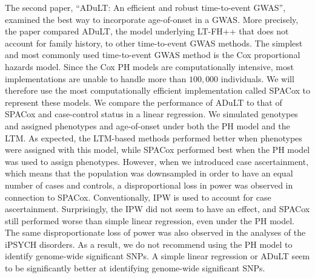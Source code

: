 The second paper, \enquote{ADuLT: An efficient and robust time-to-event GWAS}, examined the best way to incorporate age-of-onset in a GWAS. More precisely, the paper compared ADuLT, the model underlying LT-FH++ that does not account for family history, to other time-to-event GWAS methods. The simplest and most commonly used time-to-event GWAS method is the Cox proportional hazards model. Since the Cox PH models are computationally intensive, most implementations are unable to handle more than $ 100,000 $ individuals. We will therefore use the most computationally efficient implementation called SPACox to represent these models. We compare the performance of ADuLT to that of SPACox and case-control status in a linear regression. We simulated genotypes and assigned phenotypes and age-of-onset under both the PH model and the LTM. As expected, the LTM-based methods performed better when phenotypes were assigned with this model, while SPACox performed best when the PH model was used to assign phenotypes. However, when we introduced case ascertainment, which means that the population was downsampled in order to have an equal number of cases and controls, a disproportional loss in power was observed in connection to SPACox. Conventionally, IPW is used to account for case ascertainment. Surprisingly, the IPW did not seem to have an effect, and SPACox still performed worse than simple linear regression, even under the PH model. The same disproportionate loss of power was also observed in the analyses of the iPSYCH disorders. As a result, we do not recommend using the PH model to identify genome-wide significant SNPs. A simple linear regression or ADuLT seem to be significantly better at identifying genome-wide significant SNPs. 

